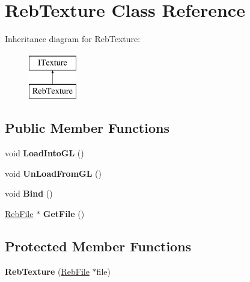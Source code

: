 \hypertarget{class_reb_texture}{}\section{Reb\+Texture Class Reference}
\label{class_reb_texture}
Inheritance diagram for Reb\+Texture\+:\begin{figure}[H]
\begin{center}
\leavevmode
\includegraphics[height=2.000000cm]{class_reb_texture}
\end{center}
\end{figure}
\subsection*{Public Member Functions}
\begin{DoxyCompactItemize}
\item 
void {\bfseries Load\+Into\+GL} ()\hypertarget{class_reb_texture_a5a4ece94ff333b9613a91a5f3d3b33ad}{}\label{class_reb_texture_a5a4ece94ff333b9613a91a5f3d3b33ad}

\item 
void {\bfseries Un\+Load\+From\+GL} ()\hypertarget{class_reb_texture_a90aa2902b43d554bb5a579fa131ab5f5}{}\label{class_reb_texture_a90aa2902b43d554bb5a579fa131ab5f5}

\item 
void {\bfseries Bind} ()\hypertarget{class_reb_texture_abf6d086e0dd717c3ec2560e6a6635cc5}{}\label{class_reb_texture_abf6d086e0dd717c3ec2560e6a6635cc5}

\item 
\hyperlink{class_reb_file}{Reb\+File} $\ast$ {\bfseries Get\+File} ()\hypertarget{class_reb_texture_a20bf9e0279ee679f560cc966858fd43f}{}\label{class_reb_texture_a20bf9e0279ee679f560cc966858fd43f}

\end{DoxyCompactItemize}
\subsection*{Protected Member Functions}
\begin{DoxyCompactItemize}
\item 
{\bfseries Reb\+Texture} (\hyperlink{class_reb_file}{Reb\+File} $\ast$file)\hypertarget{class_reb_texture_a7a4c2f1fba4c12ef8a2f8f8bce93877a}{}\label{class_reb_texture_a7a4c2f1fba4c12ef8a2f8f8bce93877a}

\end{DoxyCompactItemize}
